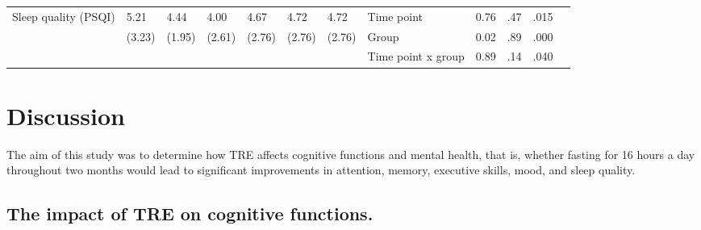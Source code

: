 \documentclass[authordate, empirical,issue]{jote-new-article}
\begin{document}
\begin{table}[th!]
\begin{fullwidth}
{\begin{tabular}{@{} l l l l l l l | l l l l l @{}}
        \hline        Sleep quality (PSQI)             & 5.21                                          & 4.44                 & 4.00                 & 4.67          & 4.72                                  & 4.72   & Time point         & 0.76 & .47  & .015 \\
                                                       & (3.23)                                        & (1.95)               & (2.61)               & (2.76)        & (2.76)                                & (2.76) & Group              & 0.02 & .89  & .000 \\
                                                       &                                               &                      &                      &               &                                       &        & Time point x group & 0.89 & .14  & .040 \\
        \bottomrule
      \end{tabular}}
  \end{fullwidth}
\end{table}





\section{Discussion }



The aim of this study was to determine how TRE affects cognitive functions and mental health, that is, whether fasting for 16 hours a day throughout two months would lead to significant improvements in attention, memory, executive skills, mood, and sleep quality.



\subsection{The impact of TRE on cognitive functions.}
\end{document}
